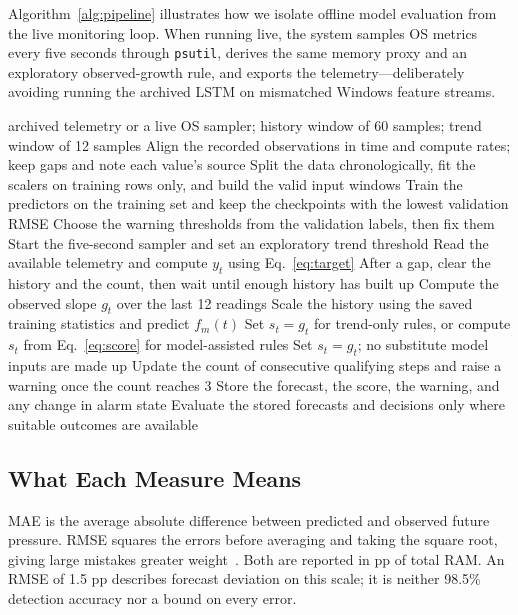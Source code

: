 \documentclass{llncs}
\begin{document}
Algorithm~\ref{alg:pipeline} illustrates how we isolate offline model evaluation from the live monitoring loop. When running live, the system samples OS metrics every five seconds through \texttt{psutil}, derives the same memory proxy and an exploratory observed-growth rule, and exports the telemetry---deliberately avoiding running the archived LSTM on mismatched Windows feature streams.
\begin{algorithm}[t]
\caption{Telemetry forecasting and causal warning generation}
\label{alg:pipeline}
\algrenewcommand{}
\begin{algorithmic}[1]
\Require archived telemetry or a live OS sampler; history window of 60 samples; trend window of 12 samples
  \State Align the recorded observations in time and compute rates; keep gaps and note each value's source
  \State Split the data chronologically, fit the scalers on training rows only, and build the valid input windows
  \State Train the predictors on the training set and keep the checkpoints with the lowest validation RMSE
  \State Choose the warning thresholds from the validation labels, then fix them
\Else
  \State Start the five-second sampler and set an exploratory trend threshold
\EndIf
{}
  \State Read the available telemetry and compute $y_t$ using Eq.~\ref{eq:target}
  \State After a gap, clear the history and the count, then wait until enough history has built up
  \State Compute the observed slope $g_t$ over the last 12 readings
    \State Scale the history using the saved training statistics and predict $f_m(t)$
    \State Set $s_t=g_t$ for trend-only rules, or compute $s_t$ from Eq.~\ref{eq:score} for model-assisted rules
  \Else
    \State Set $s_t=g_t$; no substitute model inputs are made up
  \EndIf
  \State Update the count of consecutive qualifying steps and raise a warning once the count reaches 3
  \State Store the forecast, the score, the warning, and any change in alarm state
\EndFor
\State Evaluate the stored forecasts and decisions only where suitable outcomes are available
\end{algorithmic}
\end{algorithm}

\subsection{What Each Measure Means}
MAE is the average absolute difference between predicted and observed future pressure. RMSE squares the errors before averaging and taking the square root, giving large mistakes greater weight~\cite{ref41}. Both are reported in pp of total RAM. An RMSE of 1.5 pp describes forecast deviation on this scale; it is neither 98.5\% detection accuracy nor a bound on every error.
\end{document}
